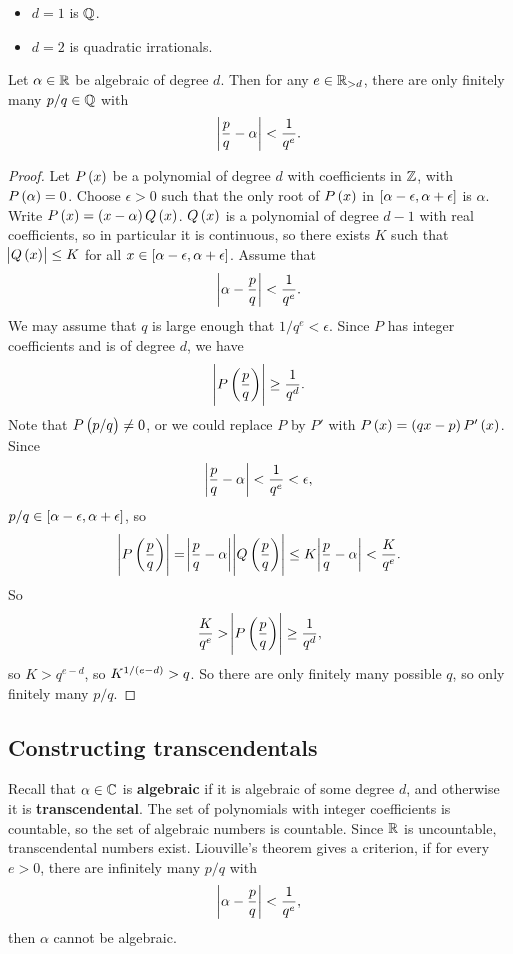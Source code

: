 \begin{example*}
\hfill
\begin{itemize}
\item $ d = 1 $ is $ \mathbb{Q} $.
\item $ d = 2 $ is quadratic irrationals.
\end{itemize}
\end{example*}

\begin{theorem}
Let $ \alpha \in \mathbb{R} $ be algebraic of degree $ d $. Then for any $ e \in \mathbb{R}_{> d} $, there are only finitely many $ p / q \in \mathbb{Q} $ with
$$ \abs{\dfrac{p}{q} - \alpha} < \dfrac{1}{q^e}. $$
\end{theorem}

\begin{proof}
Let $ P\br{x} $ be a polynomial of degree $ d $ with coefficients in $ \mathbb{Z} $, with $ P\br{\alpha} = 0 $. Choose $ \epsilon > 0 $ such that the only root of $ P\br{x} $ in $ \sbr{\alpha - \epsilon, \alpha + \epsilon} $ is $ \alpha $. Write $ P\br{x} = \br{x - \alpha}Q\br{x} $. $ Q\br{x} $ is a polynomial of degree $ d - 1 $ with real coefficients, so in particular it is continuous, so there exists $ K $ such that $ \abs{Q\br{x}} \le K $ for all $ x \in \sbr{\alpha - \epsilon, \alpha + \epsilon} $. Assume that
$$ \abs{\alpha - \dfrac{p}{q}} < \dfrac{1}{q^e}. $$
We may assume that $ q $ is large enough that $ 1 / q^e < \epsilon $. Since $ P $ has integer coefficients and is of degree $ d $, we have
$$ \abs{P\br{\dfrac{p}{q}}} \ge \dfrac{1}{q^d}. $$
Note that $ P\br{p / q} \ne 0 $, or we could replace $ P $ by $ P' $ with $ P\br{x} = \br{qx - p}P'\br{x} $. Since
$$ \abs{\dfrac{p}{q} - \alpha} < \dfrac{1}{q^e} < \epsilon, $$
$ p / q \in \sbr{\alpha - \epsilon, \alpha + \epsilon} $, so
$$ \abs{P\br{\dfrac{p}{q}}} = \abs{\dfrac{p}{q} - \alpha} \abs{Q\br{\dfrac{p}{q}}} \le K \abs{\dfrac{p}{q} - \alpha} < \dfrac{K}{q^e}. $$
So
$$ \dfrac{K}{q^e} > \abs{P\br{\dfrac{p}{q}}} \ge \dfrac{1}{q^d}, $$
so $ K > q^{e - d} $, so $ K^{1 / \br{e - d}} > q $. So there are only finitely many possible $ q $, so only finitely many $ p / q $.
\end{proof}

\subsection{Constructing transcendentals}

Recall that $ \alpha \in \mathbb{C} $ is \textbf{algebraic} if it is algebraic of some degree $ d $, and otherwise it is \textbf{transcendental}. The set of polynomials with integer coefficients is countable, so the set of algebraic numbers is countable. Since $ \mathbb{R} $ is uncountable, transcendental numbers exist. Liouville's theorem gives a criterion, if for every $ e > 0 $, there are infinitely many $ p / q $ with
$$ \abs{\alpha - \dfrac{p}{q}} < \dfrac{1}{q^e}, $$
then $ \alpha $ cannot be algebraic.

